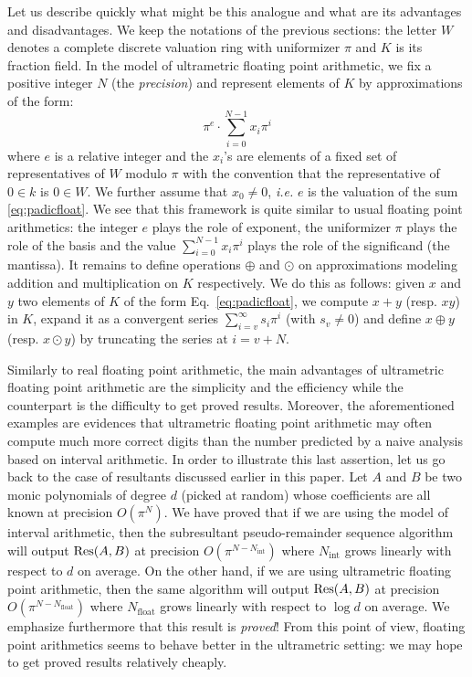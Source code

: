\documentclass{jT}
\numberwithin{equation}{section}
\theoremstyle{definition}
\renewcommand{\Res}{\text{\rm Res}}
\newcommand{\A}{W}
\begin{document}
Let us describe quickly what might be this analogue and what are its
advantages and disadvantages. We keep the notations of the previous
sections: the letter $\A$ denotes a complete discrete valuation ring
with uniformizer $\pi$ and $K$ is its fraction field.
In the model of ultrametric floating point arithmetic, we fix a
positive integer $N$ (the \emph{precision}) and represent elements 
of $K$ by approximations of the form:
\begin{equation}
\label{eq:padicfloat}
\pi^e \cdot \sum_{i=0}^{N-1} x_i \pi^i
\end{equation}
where $e$ is a relative integer and the $x_i$'s are elements of a fixed 
set of representatives of $\A$ modulo $\pi$ with the convention that the 
representative of $0 \in k$ is $0 \in \A$.
We further assume that $x_0 \neq 0$, \emph{i.e.} $e$ is the valuation
of the sum \eqref{eq:padicfloat}. We see that this framework is quite
similar to usual floating point arithmetics: the integer $e$ plays the
role of exponent, the uniformizer $\pi$ plays the role of the basis
and the value $\sum_{i=0}^{N-1} x_i \pi^i$ plays the role of the
significand (the mantissa). It remains to define operations $\oplus$
and $\odot$ on approximations modeling addition and multiplication
on $K$ respectively. We do this as follows: given $x$ and $y$ two
elements of $K$ of the form Eq.~\eqref{eq:padicfloat}, we compute
$x+y$ (resp. $xy$) in $K$, expand it as a convergent series 
$\sum_{i=v}^{\infty} s_i \pi^i$ (with $s_v \neq 0$) and define $x 
\oplus y$ (resp. $x \odot y$) by truncating the series at $i = v+N$.

Similarly to real floating point arithmetic, the main advantages of 
ultrametric floating point arithmetic are the simplicity and the 
efficiency while the counterpart is the difficulty to get proved results. 
Moreover, the aforementioned examples are evidences that ultrametric 
floating point arithmetic may often compute much more correct digits 
than the number predicted by a naive analysis based on interval arithmetic. In 
order to illustrate this last assertion, let us go back to the case of 
resultants discussed earlier in this paper. Let $A$ and $B$ be two monic 
polynomials of degree $d$ (picked at random) whose coefficients are all 
known at precision $O(\pi^N)$. We have proved that if we are using the
model of interval arithmetic, then the subresultant pseudo-remainder
sequence algorithm will output $\Res(A,B)$ at precision 
$O(\pi^{N-N_{\text{int}}})$ where $N_{\text{int}}$ grows linearly 
with respect to $d$ on average. On the other hand, if we are using 
ultrametric floating point arithmetic, then the same algorithm will
output $\Res(A,B)$ at precision $O(\pi^{N-N_{\text{float}}})$ where 
$N_{\text{float}}$ grows linearly with respect to $\log d$ on average.
We emphasize furthermore that this result is \emph{proved}! From this
point of view, floating point arithmetics seems to behave better in
the ultrametric setting: we may hope to get proved results relatively
cheaply.
\end{document}
